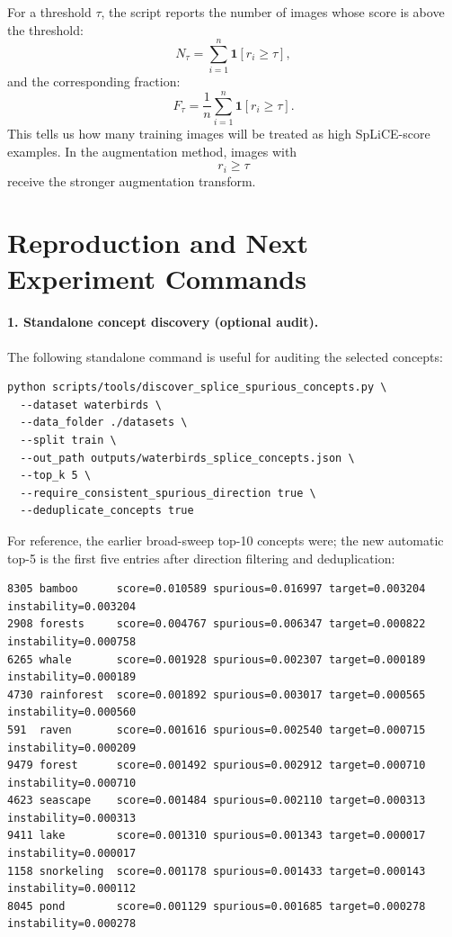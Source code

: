 \documentclass[11pt,a4paper]{article}
\begin{document}
For a threshold \(\tau\), the script reports the number of images whose score is
above the threshold:
\[
N_{\tau}
=
\sum_{i=1}^{n}
\mathbf{1}[r_i \geq \tau],
\]
and the corresponding fraction:
\[
F_{\tau}
=
\frac{1}{n}
\sum_{i=1}^{n}
\mathbf{1}[r_i \geq \tau].
\]
This tells us how many training images will be treated as high SpLiCE-score
examples. In the augmentation method, images with
\[
r_i \geq \tau
\]
receive the stronger augmentation transform.


\section{Reproduction and Next Experiment Commands}

\paragraph{1. Standalone concept discovery (optional audit).}
The following standalone command is useful for auditing the selected concepts:

\begin{verbatim}
python scripts/tools/discover_splice_spurious_concepts.py \
  --dataset waterbirds \
  --data_folder ./datasets \
  --split train \
  --out_path outputs/waterbirds_splice_concepts.json \
  --top_k 5 \
  --require_consistent_spurious_direction true \
  --deduplicate_concepts true
\end{verbatim}

For reference, the earlier broad-sweep top-10 concepts were; the new automatic
top-5 is the first five entries after direction filtering and deduplication:
\begin{verbatim}
8305 bamboo      score=0.010589 spurious=0.016997 target=0.003204 instability=0.003204
2908 forests     score=0.004767 spurious=0.006347 target=0.000822 instability=0.000758
6265 whale       score=0.001928 spurious=0.002307 target=0.000189 instability=0.000189
4730 rainforest  score=0.001892 spurious=0.003017 target=0.000565 instability=0.000560
591  raven       score=0.001616 spurious=0.002540 target=0.000715 instability=0.000209
9479 forest      score=0.001492 spurious=0.002912 target=0.000710 instability=0.000710
4623 seascape    score=0.001484 spurious=0.002110 target=0.000313 instability=0.000313
9411 lake        score=0.001310 spurious=0.001343 target=0.000017 instability=0.000017
1158 snorkeling  score=0.001178 spurious=0.001433 target=0.000143 instability=0.000112
8045 pond        score=0.001129 spurious=0.001685 target=0.000278 instability=0.000278
\end{verbatim}
\end{document}

